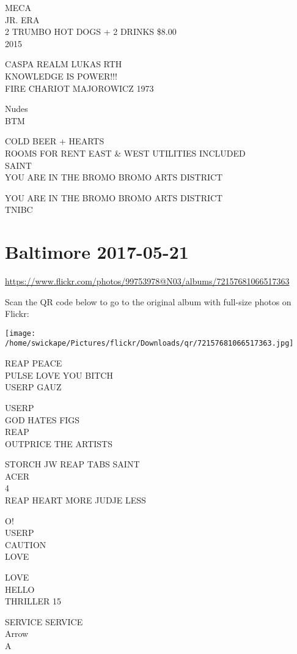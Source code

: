 \documentclass[10pt,letterpaper]{article}
\begin{document}
MECA\\
JR. ERA\\
2 TRUMBO HOT DOGS + 2 DRINKS \$8.00\\
2015

CASPA REALM LUKAS RTH\\
KNOWLEDGE IS POWER!!!\\
FIRE CHARIOT MAJOROWICZ 1973

Nudes\\
BTM

COLD BEER + HEARTS\\
ROOMS FOR RENT EAST \& WEST UTILITIES INCLUDED\\
SAINT\\
YOU ARE IN THE BROMO BROMO ARTS DISTRICT

YOU ARE IN THE BROMO BROMO ARTS DISTRICT\\
TNIBC


\section*{Baltimore 2017-05-21}

\url{https://www.flickr.com/photos/99753978@N03/albums/72157681066517363}

Scan the QR code below to go to the original album with full-size photos on Flickr:

\texttt{[image: /home/swickape/Pictures/flickr/Downloads/qr/72157681066517363.jpg]}


REAP PEACE\\
PULSE LOVE YOU BITCH\\
USERP GAUZ

USERP\\
GOD HATES FIGS\\
REAP\\
OUTPRICE THE ARTISTS

STORCH JW REAP TABS SAINT\\
ACER\\
4\\
REAP HEART MORE JUDJE LESS

O!\\
USERP\\
CAUTION\\
LOVE

LOVE\\
HELLO\\
THRILLER 15

SERVICE SERVICE\\
Arrow\\
A
\end{document}
